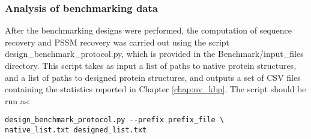 \subsubsection{Analysis of benchmarking data}

After the benchmarking designs were performed, the computation of sequence recovery and \ac{PSSM} recovery was carried out using the script design\_benchmark\_protocol.py, which is provided in the Benchmark/input\_files directory.
This script takes as input a list of paths to native protein structures, and a list of paths to designed protein structures, and outputs a set of \ac{CSV} files containing the statistics reported in Chapter \ref{chap:nv_kbp}.
The script should be run as:

\singlespace
\begin{Verbatim}
design_benchmark_protocol.py --prefix prefix_file \
native_list.txt designed_list.txt
\end{Verbatim}
\doublespace
